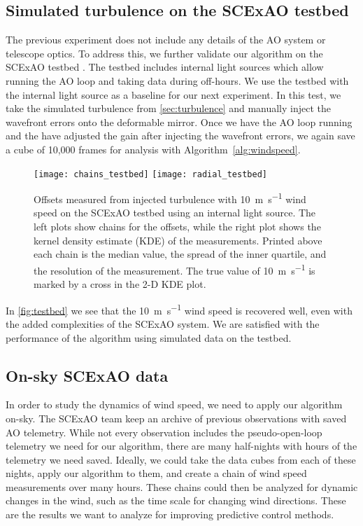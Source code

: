 \subsection{Simulated turbulence on the SCExAO testbed}\label{sec:turbulence}

The previous experiment does not include any details of the AO system or telescope optics. To address this, we further validate our algorithm on the SCExAO testbed \citep{guyon_wavefront_2011}. The testbed includes internal light sources which allow running the AO loop and taking data during off-hours. We use the testbed with the internal light source as a baseline for our next experiment. In this test, we take the simulated turbulence from \autoref{sec:turbulence} and manually inject the wavefront errors onto the deformable mirror. Once we have the AO loop running and the have adjusted the gain after injecting the wavefront errors, we again save a cube of 10,000 frames for analysis with Algorithm~\autoref{alg:windspeed}.

\begin{figure}
    \centering
    \texttt{[image: chains\_testbed]}
    \texttt{[image: radial\_testbed]}
    \caption{Offsets measured from injected turbulence with \SI{10}{\meter\per\second} wind speed on the SCExAO testbed using an internal light source. The left plots show chains for the offsets, while the right plot shows the kernel density estimate (KDE) of the measurements. Printed above each chain is the median value, the spread of the inner quartile, and the resolution of the measurement. The true value of \SI{10}{\meter\per\second} is marked by a cross in the 2-D KDE plot.}
    \label{fig:testbed}
\end{figure}

In \autoref{fig:testbed} we see that the \SI{10}{\meter\per\second} wind speed is recovered well, even with the added complexities of the SCExAO system. We are satisfied with the performance of the algorithm using simulated data on the testbed.

\subsection{On-sky SCExAO data}\label{sec:onsky}

In order to study the dynamics of wind speed, we need to apply our algorithm on-sky. The SCExAO team keep an archive of previous observations with saved AO telemetry. While not every observation includes the pseudo-open-loop telemetry we need for our algorithm, there are many half-nights with hours of the telemetry we need saved. Ideally, we could take the data cubes from each of these nights, apply our algorithm to them, and create a chain of wind speed measurements over many hours. These chains could then be analyzed for dynamic changes in the wind, such as the time scale for changing wind directions. These are the results we want to analyze for improving predictive control methods.

